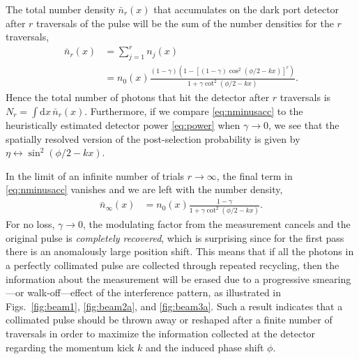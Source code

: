 The total number density $\bar{n}_r(x)$ that accumulates on the dark port detector after $r$ traversals of the pulse will be the sum of the number densities for the $r$ traversals,
\begin{align}\label{eq:nminusacc}
  \bar{n}_r(x) &= \sum_{j=1}^r n_j(x) \\
  &= n_0(x) \frac{(1-\gamma)\left(1 - \left[(1-\gamma) \cos^{2}\left(\phi/2 - kx\right)\right]^r\right)}{1 + \gamma \cot^2\left(\phi/2 - kx\right)}. \nonumber
\end{align}
Hence the total number of photons that hit the detector after $r$ traversals is $N_r = \int \! \textrm{d}x\, \bar{n}_r(x)$.  Furthermore, if we compare \eqref{eq:nminusacc} to the heuristically estimated detector power \eqref{eq:power} when $\gamma\to 0$, we see that the spatially resolved version of the post-selection probability is given by $\eta \leftrightarrow \sin^2(\phi/2 - k x)$.

In the limit of an infinite number of trials $r \to \infty$, the final term in \eqref{eq:nminusacc} vanishes and we are left with the number density,
\begin{align}\label{eq:nminusacclimit}
  \bar{n}_\infty(x) &= n_0(x) \frac{1-\gamma}{1 + \gamma \cot^2\left(\phi/2 - kx\right)}.
\end{align}
For no loss, $\gamma \to 0$, the modulating factor from the measurement cancels and the original pulse is \emph{completely recovered}, which is surprising since for the first pass there is an anomalously large position shift.  This means that if all the photons in a perfectly collimated pulse are collected through repeated recycling, then the information about the measurement will be erased due to a progressive smearing---or walk-off---effect of the interference pattern, as illustrated in Figs.~\ref{fig:beam1}, \ref{fig:beam2a}, and \ref{fig:beam3a}.  Such a result indicates that a collimated pulse should be thrown away or reshaped after a finite number of traversals in order to maximize the information collected at the detector regarding the momentum kick $k$ and the induced phase shift $\phi$.

